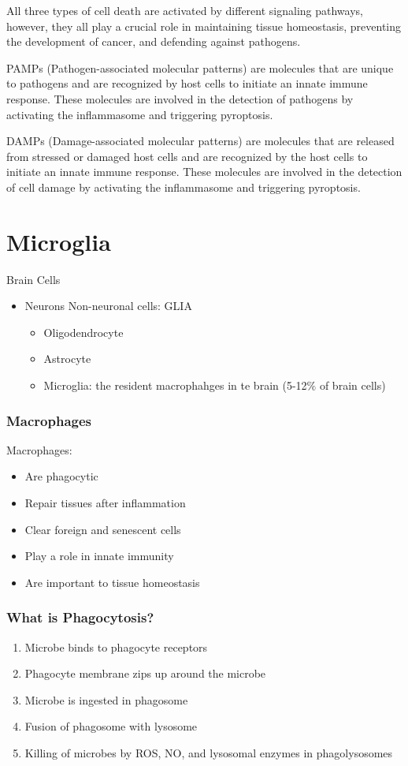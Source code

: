 \begin{itemize}
\begin{itemize}
All three types of cell death are activated by different signaling pathways, however, they all play a crucial role in maintaining tissue homeostasis, preventing the development of cancer, and defending against pathogens.

PAMPs (Pathogen-associated molecular patterns) are molecules that are unique to pathogens and are recognized by host cells to initiate an innate immune response. These molecules are involved in the detection of pathogens by activating the inflammasome and triggering pyroptosis.

DAMPs (Damage-associated molecular patterns) are molecules that are released from stressed or damaged host cells and are recognized by the host cells to initiate an innate immune response. These molecules are involved in the detection of cell damage by activating the inflammasome and triggering pyroptosis.

\section{Microglia}
Brain Cells
\begin{itemize}
    \item Neurons
    \itemize Non-neuronal cells: GLIA
    \begin{itemize}
        \item Oligodendrocyte
        \item Astrocyte
        \item Microglia: the resident macrophahges in te brain (5-12$\%$ of brain cells)
    \end{itemize}
\end{itemize}

\subsubsection{Macrophages}
Macrophages:
\begin{itemize}
    \item Are phagocytic
    \item Repair tissues after inflammation
    \item Clear foreign and senescent cells
    \item Play a role in innate immunity
    \item Are important to tissue homeostasis
\end{itemize}

\subsubsection{What is Phagocytosis?}
\begin{enumerate}
    \item Microbe binds to phagocyte receptors
    \item Phagocyte membrane zips up around the microbe
    \item Microbe is ingested in phagosome
    \item Fusion of phagosome with lysosome
    \item Killing of microbes by ROS, NO, and lysosomal enzymes in phagolysosomes
\end{enumerate}


\end{itemize}
\end{itemize}

